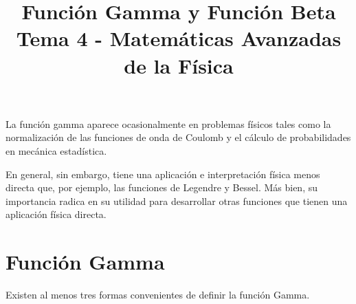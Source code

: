 
\title{Función Gamma y Función Beta \\ {\large Tema 4 - Matemáticas Avanzadas de la Física}\vspace{-1.5\baselineskip}}
\date{ }
\author{}

\renewcommand\labelenumii{\theenumi.{\arabic{enumii}}}
\maketitle
\fontsize{14}{14}\selectfont
La función gamma aparece ocasionalmente en problemas físicos tales como la normalización de las funciones de onda de Coulomb y el cálculo de probabilidades en mecánica estadística.
\par
En general, sin embargo, tiene una aplicación e interpretación física menos directa que, por ejemplo, las funciones de Legendre y Bessel. Más bien, su importancia radica en su utilidad para desarrollar otras funciones que tienen una aplicación física directa.
\section{Función Gamma}
Existen al menos tres formas convenientes de definir la función Gamma.
